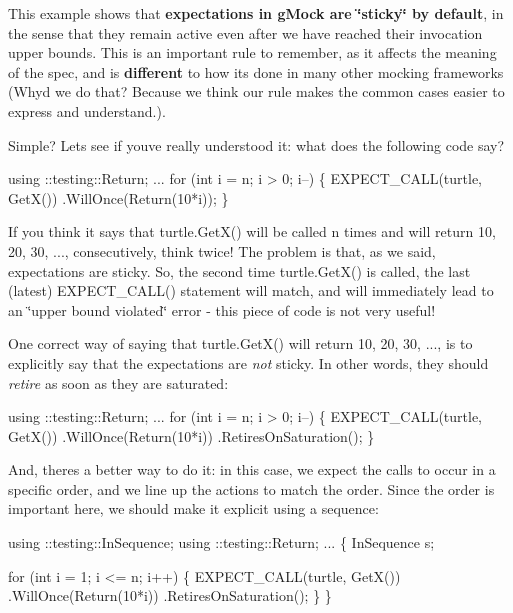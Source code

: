 This example shows that {\bfseries expectations in g\+Mock are \char`\"{}sticky\char`\"{} by default}, in the sense that they remain active even after we have reached their invocation upper bounds. This is an important rule to remember, as it affects the meaning of the spec, and is {\bfseries different} to how it\textquotesingle{}s done in many other mocking frameworks (Why\textquotesingle{}d we do that? Because we think our rule makes the common cases easier to express and understand.).

Simple? Let\textquotesingle{}s see if you\textquotesingle{}ve really understood it\+: what does the following code say?


\begin{DoxyCode}
using ::testing::Return;
...
for (\textcolor{keywordtype}{int} i = n; i > 0; i--) \{
  EXPECT\_CALL(turtle, GetX())
      .WillOnce(Return(10*i));
\}
\end{DoxyCode}


If you think it says that {\ttfamily turtle.\+Get\+X()} will be called {\ttfamily n} times and will return 10, 20, 30, ..., consecutively, think twice! The problem is that, as we said, expectations are sticky. So, the second time {\ttfamily turtle.\+Get\+X()} is called, the last (latest) {\ttfamily E\+X\+P\+E\+C\+T\+\_\+\+C\+A\+L\+L()} statement will match, and will immediately lead to an \char`\"{}upper bound violated\char`\"{} error -\/ this piece of code is not very useful!

One correct way of saying that {\ttfamily turtle.\+Get\+X()} will return 10, 20, 30, ..., is to explicitly say that the expectations are {\itshape not} sticky. In other words, they should {\itshape retire} as soon as they are saturated\+:


\begin{DoxyCode}
using ::testing::Return;
...
for (\textcolor{keywordtype}{int} i = n; i > 0; i--) \{
  EXPECT\_CALL(turtle, GetX())
      .WillOnce(Return(10*i))
      .RetiresOnSaturation();
\}
\end{DoxyCode}


And, there\textquotesingle{}s a better way to do it\+: in this case, we expect the calls to occur in a specific order, and we line up the actions to match the order. Since the order is important here, we should make it explicit using a sequence\+:


\begin{DoxyCode}
using ::testing::InSequence;
using ::testing::Return;
...
\{
  InSequence s;

  \textcolor{keywordflow}{for} (\textcolor{keywordtype}{int} i = 1; i <= n; i++) \{
    EXPECT\_CALL(turtle, GetX())
        .WillOnce(Return(10*i))
        .RetiresOnSaturation();
  \}
\}
\end{DoxyCode}


